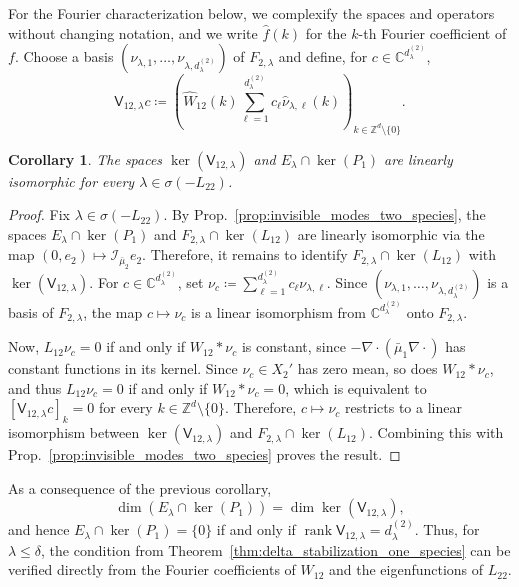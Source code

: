 \documentclass[letterpaper, 10pt, conference]{ieeeconf}
\newtheorem{corollary}[theorem]{Corollary}
\newcommand{\rieszmap}[1][\mu]{\mathcal{I}_{#1}}
\begin{document}
For the Fourier characterization below, we complexify the spaces and operators without changing notation, and we write $\widehat{f}(k)$ for the $k$-th Fourier coefficient of $f$.
Choose a basis $(\nu_{\lambda,1}, \ldots, \nu_{\lambda,d_\lambda^{(2)}})$ of $F_{2,\lambda}$ and define, for $c \in \mathbb{C}^{d_\lambda^{(2)}}$,
\[
\mathsf{V}_{12,\lambda}c \coloneqq \left(\widehat{W}_{12}(k) \sum_{\ell=1}^{d_\lambda^{(2)}} c_\ell \widehat\nu_{\lambda,\ell}(k)\right)_{k \in \mathbb{Z}^d \setminus \{0\}}.
\]

\begin{corollary}
    \label{cor:fourier_two_species}
    The spaces $\ker(\mathsf{V}_{12,\lambda})$ and $E_\lambda \cap \ker(P_1)$ are linearly isomorphic for every $\lambda \in \sigma(-L_{22})$.
\end{corollary}

\begin{proof}
    Fix $\lambda \in \sigma(-L_{22})$.
    By Prop.~\ref{prop:invisible_modes_two_species}, the spaces $E_\lambda \cap \ker(P_1)$ and $F_{2,\lambda} \cap \ker(L_{12})$ are linearly isomorphic via the map $(0,e_2) \mapsto \rieszmap[\bar\mu_2]e_2$.
    Therefore, it remains to identify $F_{2,\lambda} \cap \ker(L_{12})$ with $\ker(\mathsf{V}_{12,\lambda})$.
    For $c \in \mathbb{C}^{d_\lambda^{(2)}}$, set $\nu_c \coloneqq \sum_{\ell=1}^{d_\lambda^{(2)}} c_\ell \nu_{\lambda,\ell}$.
    Since $(\nu_{\lambda,1}, \ldots, \nu_{\lambda,d_\lambda^{(2)}})$ is a basis of $F_{2,\lambda}$, the map $c \mapsto \nu_c$ is a linear isomorphism from $\mathbb{C}^{d_\lambda^{(2)}}$ onto $F_{2,\lambda}$.

    Now, $L_{12} \nu_c = 0$ if and only if $W_{12} \ast \nu_c$ is constant, since $-\nabla \cdot (\bar\mu_1 \nabla\cdot)$ has constant functions in its kernel.
    Since $\nu_c \in X_2'$ has zero mean, so does $W_{12} \ast \nu_c$, and thus $L_{12}\nu_c = 0$ if and only if $W_{12} \ast \nu_c = 0$, which is equivalent to $[\mathsf{V}_{12,\lambda}c]_k = 0$ for every $k \in \mathbb{Z}^d \setminus \{0\}$.
    Therefore, $c \mapsto \nu_c$ restricts to a linear isomorphism between $\ker(\mathsf{V}_{12,\lambda})$ and $F_{2,\lambda} \cap \ker(L_{12})$.
    Combining this with Prop.~\ref{prop:invisible_modes_two_species} proves the result.
\end{proof}

As a consequence of the previous corollary, 
\[
\dim \left(E_\lambda \cap \ker(P_1)\right) = \dim \ker(\mathsf{V}_{12,\lambda}),
\]
and hence $E_\lambda \cap \ker(P_1) = \{0\}$ if and only if $\operatorname{rank} \mathsf{V}_{12,\lambda} = d_\lambda^{(2)}$.
Thus, for $\lambda \le \delta$, the condition from Theorem~\ref{thm:delta_stabilization_one_species} can be verified directly from the Fourier coefficients of $W_{12}$ and the eigenfunctions of $L_{22}$.
\end{document}
